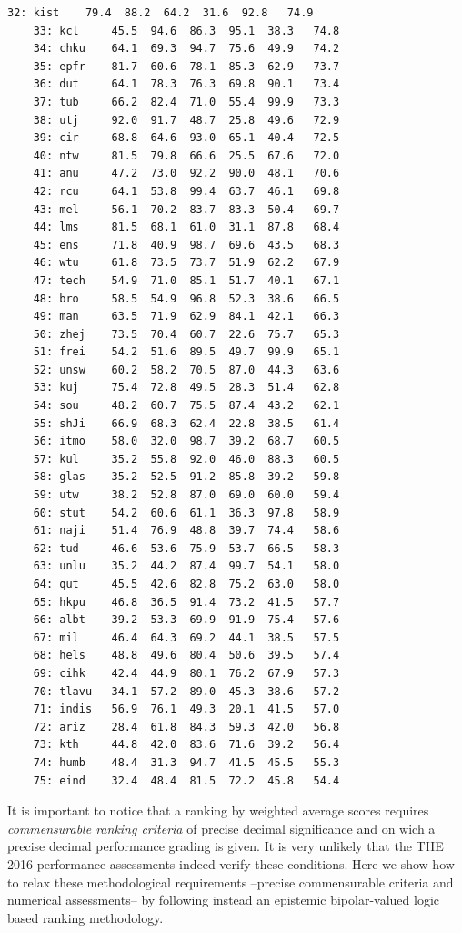 \begin{lstlisting}[caption={Printing the ranked performance table},label=list:13.5]
    32: kist 	79.4  88.2  64.2  31.6  92.8   74.9
    33: kcl 	45.5  94.6  86.3  95.1  38.3   74.8
    34: chku 	64.1  69.3  94.7  75.6  49.9   74.2
    35: epfr 	81.7  60.6  78.1  85.3  62.9   73.7
    36: dut 	64.1  78.3  76.3  69.8  90.1   73.4
    37: tub 	66.2  82.4  71.0  55.4  99.9   73.3
    38: utj 	92.0  91.7  48.7  25.8  49.6   72.9
    39: cir 	68.8  64.6  93.0  65.1  40.4   72.5
    40: ntw 	81.5  79.8  66.6  25.5  67.6   72.0
    41: anu 	47.2  73.0  92.2  90.0  48.1   70.6
    42: rcu 	64.1  53.8  99.4  63.7  46.1   69.8
    43: mel 	56.1  70.2  83.7  83.3  50.4   69.7
    44: lms 	81.5  68.1  61.0  31.1  87.8   68.4
    45: ens 	71.8  40.9  98.7  69.6  43.5   68.3
    46: wtu 	61.8  73.5  73.7  51.9  62.2   67.9
    47: tech 	54.9  71.0  85.1  51.7  40.1   67.1
    48: bro 	58.5  54.9  96.8  52.3  38.6   66.5
    49: man 	63.5  71.9  62.9  84.1  42.1   66.3
    50: zhej 	73.5  70.4  60.7  22.6  75.7   65.3
    51: frei 	54.2  51.6  89.5  49.7  99.9   65.1
    52: unsw 	60.2  58.2  70.5  87.0  44.3   63.6
    53: kuj 	75.4  72.8  49.5  28.3  51.4   62.8
    54: sou 	48.2  60.7  75.5  87.4  43.2   62.1
    55: shJi 	66.9  68.3  62.4  22.8  38.5   61.4
    56: itmo 	58.0  32.0  98.7  39.2  68.7   60.5
    57: kul 	35.2  55.8  92.0  46.0  88.3   60.5
    58: glas 	35.2  52.5  91.2  85.8  39.2   59.8
    59: utw 	38.2  52.8  87.0  69.0  60.0   59.4
    60: stut 	54.2  60.6  61.1  36.3  97.8   58.9
    61: naji 	51.4  76.9  48.8  39.7  74.4   58.6
    62: tud 	46.6  53.6  75.9  53.7  66.5   58.3
    63: unlu 	35.2  44.2  87.4  99.7  54.1   58.0
    64: qut 	45.5  42.6  82.8  75.2  63.0   58.0
    65: hkpu 	46.8  36.5  91.4  73.2  41.5   57.7
    66: albt 	39.2  53.3  69.9  91.9  75.4   57.6
    67: mil 	46.4  64.3  69.2  44.1  38.5   57.5
    68: hels 	48.8  49.6  80.4  50.6  39.5   57.4
    69: cihk 	42.4  44.9  80.1  76.2  67.9   57.3
    70: tlavu 	34.1  57.2  89.0  45.3  38.6   57.2
    71: indis 	56.9  76.1  49.3  20.1  41.5   57.0
    72: ariz 	28.4  61.8  84.3  59.3  42.0   56.8
    73: kth 	44.8  42.0  83.6  71.6  39.2   56.4
    74: humb 	48.4  31.3  94.7  41.5  45.5   55.3
    75: eind 	32.4  48.4  81.5  72.2  45.8   54.4
\end{lstlisting}

It is important to notice that a ranking by weighted average scores requires \emph{commensurable ranking criteria} of precise decimal significance and on wich a precise decimal performance grading is given. It is very unlikely that the THE 2016 performance assessments indeed verify these conditions. Here we show how to relax these methodological requirements --precise commensurable criteria and numerical assessments-- by following instead an epistemic bipolar-valued logic based ranking methodology.

